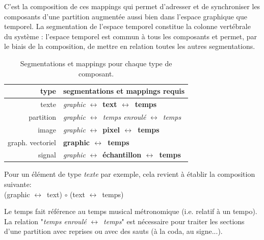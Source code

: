 \documentclass{article}
\newcommand{\lra}				{$\leftrightarrow$}
\newcommand{\rshift}			{\hspace*{4mm}}
\begin{document}
C'est la composition de ces mappings qui permet d'adresser et de synchroniser les composants d'une partition augmentée aussi bien dans l'espace graphique que temporel. La segmentation de l'espace temporel constitue la colonne vertébrale du système : l'espace temporel est commun à tous les composants et permet, par le biais de la composition, de mettre en relation toutes les autres segmentations.

\begin{table}[h]
\begin{center}
\begin{tabular}{|r|l|}
\hline
type & segmentations et mappings requis \\
\hline
texte		& \textit{graphic} \lra\ \textbf{text  \lra\ temps} \\
partition	& \textit{graphic \lra\ temps enroulé} \lra\ \textit{temps} \\
image		& \textit{graphic} \lra\ \textbf{pixel \lra\ temps } \\
graph. vectoriel	&  \textbf{graphic \lra\ temps } \\
signal		&  \textit{graphic} \lra\ \textbf{échantillon \lra\ temps } \\
\hline
\end{tabular}
\caption{Segmentations et mappings pour chaque type de composant.}
\end{center}
\label{maptable}
\end{table}

\vspace{-3mm}
Pour un élément de type \emph{texte} par exemple, cela revient à établir la composition suivante: \\
\rshift (graphic \lra\ text) $\circ$ (text \lra\ temps)

Le temps fait référence au temps musical métronomique (i.e. relatif à un tempo). La relation "\textit{temps enroulé} \lra\ \textit{temps}" est nécessaire pour traiter les sections d'une partition avec reprises ou avec des sauts (à la coda, au signe...).

\end{document}
